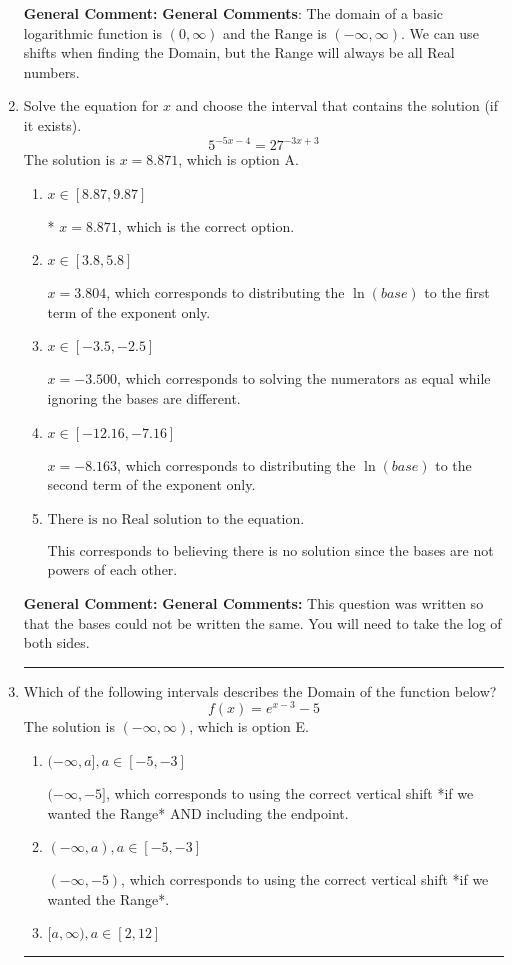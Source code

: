 \documentclass{extbook}[14pt]
\newcommand{\litem}[1]{\item #1

\rule{\textwidth}{0.4pt}}
\begin{document}
\begin{enumerate}
{\textbf{General Comment:} \textbf{General Comments}: The domain of a basic logarithmic function is $(0, \infty)$ and the Range is $(-\infty, \infty)$. We can use shifts when finding the Domain, but the Range will always be all Real numbers.
}
\litem{
Solve the equation for $x$ and choose the interval that contains the solution (if it exists).
\[ 5^{-5x-4} = 27^{-3x+3} \]The solution is \( x = 8.871 \), which is option A.\begin{enumerate}[label=\Alph*.]
\item \( x \in [8.87, 9.87] \)

* $x = 8.871$, which is the correct option.
\item \( x \in [3.8, 5.8] \)

$x = 3.804$, which corresponds to distributing the $\ln(base)$ to the first term of the exponent only.
\item \( x \in [-3.5, -2.5] \)

$x = -3.500$, which corresponds to solving the numerators as equal while ignoring the bases are different.
\item \( x \in [-12.16, -7.16] \)

$x = -8.163$, which corresponds to distributing the $\ln(base)$ to the second term of the exponent only.
\item \( \text{There is no Real solution to the equation.} \)

This corresponds to believing there is no solution since the bases are not powers of each other.
\end{enumerate}

\textbf{General Comment:} \textbf{General Comments:} This question was written so that the bases could not be written the same. You will need to take the log of both sides.
}
\litem{
Which of the following intervals describes the Domain of the function below?
\[ f(x) = e^{x-3}-5 \]The solution is \( (-\infty, \infty) \), which is option E.\begin{enumerate}[label=\Alph*.]
\item \( (-\infty, a], a \in [-5, -3] \)

$(-\infty, -5]$, which corresponds to using the correct vertical shift *if we wanted the Range* AND including the endpoint.
\item \( (-\infty, a), a \in [-5, -3] \)

$(-\infty, -5)$, which corresponds to using the correct vertical shift *if we wanted the Range*.
\item \( [a, \infty), a \in [2, 12] \)


\end{enumerate}}
\end{enumerate}
\end{document}
